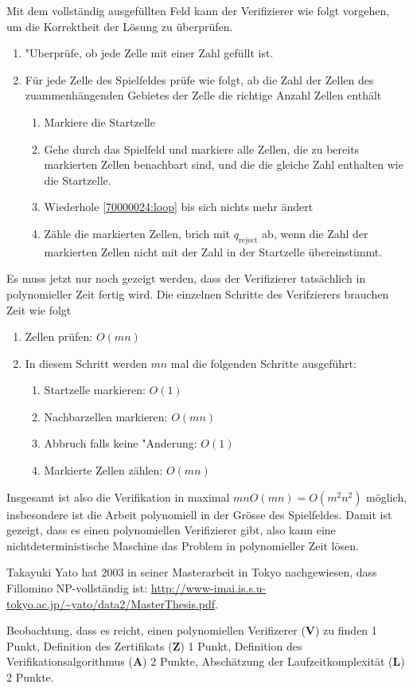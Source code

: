 \begin{loesung}
Mit dem vollständig ausgefüllten Feld kann der Verifizierer wie folgt
vorgehen, um die Korrektheit der Lösung zu überprüfen.
\begin{enumerate}
\item "Uberprüfe, ob jede Zelle mit einer Zahl gefüllt ist.
\item Für jede Zelle des Spielfeldes prüfe wie folgt, ab die Zahl der
Zellen des zuammenhängenden Gebietes der Zelle die richtige Anzahl
Zellen enthält
\begin{enumerate}
\item Markiere die Startzelle
\item \label{70000024:loop} Gehe durch das Spielfeld und markiere alle Zellen, die zu bereits
markierten Zellen benachbart sind, und die die gleiche Zahl enthalten wie
die Startzelle.
\item Wiederhole \ref{70000024:loop} bis sich nichts mehr ändert
\item Zähle die markierten Zellen, brich mit $q_{\text{reject}}$ ab,
wenn die Zahl der markierten Zellen nicht mit der Zahl in der Startzelle
übereinstimmt.
\end{enumerate}
\end{enumerate}
Es muss jetzt nur noch gezeigt werden, dass der Verifizierer tatsächlich
in polynomieller Zeit fertig wird. Die einzelnen Schritte des Verifzierers
brauchen Zeit wie folgt
\begin{enumerate}
\item Zellen prüfen: $O(mn)$
\item In diesem Schritt werden $mn$ mal die folgenden Schritte ausgeführt:
\begin{enumerate}
\item Startzelle markieren: $O(1)$
\item Nachbarzellen markieren: $O(mn)$
\item Abbruch falls keine "Anderung: $O(1)$
\item Markierte Zellen zählen: $O(mn)$
\end{enumerate}
\end{enumerate}
Insgesamt ist also die Verifikation in maximal $mnO(mn)=O(m^2n^2)$ möglich,
insbesondere ist die Arbeit polynomiell in der Grösse des Spielfeldes.
Damit ist gezeigt, dass es einen polynomiellen Verifizierer gibt,
also kann eine nichtdeterministische Maschine das Problem in polynomieller
Zeit lösen.
\end{loesung}

\begin{diskussion}
Takayuki Yato hat 2003 in seiner Masterarbeit in Tokyo nachgewiesen,
dass Fillomino NP-vollständig ist:
\url{http://www-imai.is.s.u-tokyo.ac.jp/~yato/data2/MasterThesis.pdf}.
\end{diskussion}

\begin{bewertung}
Beobachtung, dass es reicht, einen polynomiellen Verifizerer ({\bf V})
zu finden 1 Punkt,
Definition des Zertifikats ({\bf Z}) 1 Punkt,
Definition des Verifikationsalgorithmus ({\bf A}) 2 Punkte,
Abschätzung der Laufzeitkomplexität ({\bf L}) 2 Punkte.
\end{bewertung}

